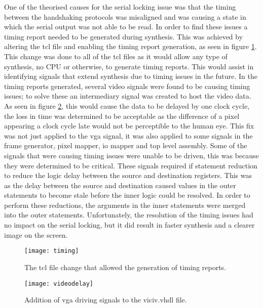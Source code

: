 \label{Ch5 Sec1 Sub2}

One of the theorised causes for the serial locking issue was that the timing between the handshaking protocols was misaligned and was causing a state in which the serial output was not able to be read. In order to find these issues a timing report needed to be generated during synthesis. This was achieved by altering the tcl file and enabling the timing report generation, as seen in figure \ref{fig:timing}. This change was done to all of the tcl files as it would allow any type of synthesis, no CPU or otherwise, to generate timing reports. This would assist in identifying signals that extend synthesis due to timing issues in the future. In the timing reports generated, several video signals were found to be causing timing issues; to solve these an intermediary signal was created to host the video data. As seen in figure \ref{fig:videodelay}, this would cause the data to be delayed by one clock cycle, the loss in time was determined to be acceptable as the difference of a pixel appearing a clock cycle late would not be perceptible to the human eye. This fix was not just applied to the vga signal, it was also applied to some signals in the frame generator, pixel mapper, io mapper and top level assembly. Some of the signals that were causing timing issues were unable to be driven, this was because they were determined to be critical. These signals required if statement reduction to reduce the logic delay between the source and destination registers. This was as the delay between the source and destination caused values in the outer statements to become stale before the inner logic could be resolved. In order to perform these reductions, the arguments in the inner statements were merged into the outer statements. Unfortunately, the resolution of the timing issues had no impact on the serial locking, but it did result in faster synthesis and a clearer image on the screen.

\begin{figure}
  \centering
  \texttt{[image: timing]}
  \caption{The tcl file change that allowed the generation of timing reports.}
  \label{fig:timing}
\end{figure}

\begin{figure}
  \centering
  \texttt{[image: videodelay]}
  \caption{Addition of vga driving signals to the viciv.vhdl file.}
  \label{fig:videodelay}
\end{figure}

